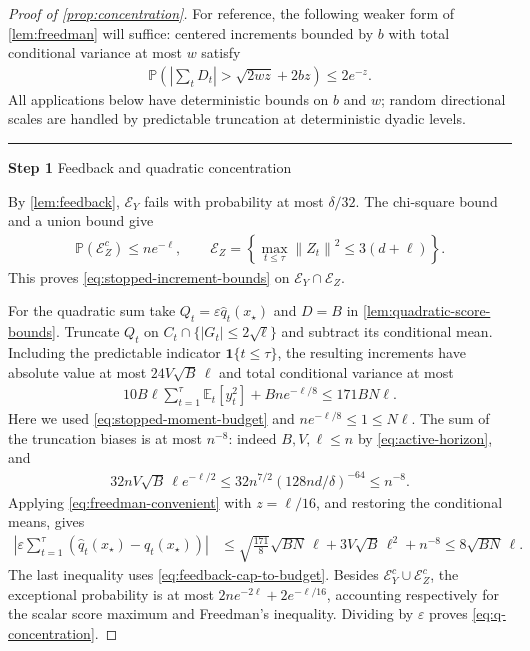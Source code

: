 \documentclass[11pt]{article}
\newcommand{\proofstep}[2]{%
    \par\medskip
    \noindent
    \textcolor{blue!55!black}{\rule{2pt}{1.2em}}%
    \hspace{0.6em}%
    {\sffamily\bfseries\color{blue!55!black}Step #1}%
    \quad
    {\sffamily #2}%
    \par\smallskip
}
\newcommand{\E}{\mathbb E}
\newcommand{\Pp}{\mathbb P}
\newcommand{\1}{\mathbf 1}
\newcommand{\eps}{\varepsilon}
\newcommand{\norm}[1]{\left\lVert #1\right\rVert}
\begin{document}
\begin{proof}[Proof of \cref{prop:concentration}]
    For reference, the following weaker form of \cref{lem:freedman}
    will suffice: centered increments bounded by $b$ with total
    conditional variance at most $w$ satisfy
    \begin{align}
        \Pp\left(\left|\sum_tD_t\right|>\sqrt{2wz}+2bz\right)
        \leq2e^{-z}.
        \label{eq:freedman-convenient}
    \end{align}
    All applications below have deterministic bounds on $b$ and $w$;
    random directional scales are handled by predictable truncation at
    deterministic dyadic levels.

    \proofstep{1}{Feedback and quadratic concentration}
    By \cref{lem:feedback}, $\mathcal E_Y$ fails with probability at most
    $\delta/32$. The chi-square bound and a union bound give
    \begin{align}
        \Pp(\mathcal E_Z^c)\leq ne^{-\ell},
        \qquad
        \mathcal E_Z=\left\{
        \max_{t\leq\tau}\norm{Z_t}^2\leq3(d+\ell)\right\}.
        \label{eq:Z-norm-union}
    \end{align}
    This proves \eqref{eq:stopped-increment-bounds} on
    $\mathcal E_Y\cap\mathcal E_Z$.

    For the quadratic sum take $Q_t=\eps\widehat q_t(x_\star)$ and
    $D=B$ in \cref{lem:quadratic-score-bounds}. Truncate $Q_t$ on
    $C_t\cap\{|G_t|\leq2\sqrt\ell\}$ and subtract its conditional mean.
    Including the predictable indicator $\1\{t\leq\tau\}$, the resulting
    increments have absolute value at most $24V\sqrt B\,\ell$ and total
    conditional variance at most
    \begin{align}
        10B\ell\sum_{t=1}^\tau\E_t[y_t^2]+Bn e^{-\ell/8}
        \leq171BN\ell.
        \label{eq:global-q-variance}
    \end{align}
    Here we used \eqref{eq:stopped-moment-budget} and
    $ne^{-\ell/8}\leq1\leq N\ell$.
    The sum of the truncation biases is at most $n^{-8}$: indeed
    $B,V,\ell\leq n$ by \eqref{eq:active-horizon}, and
    \begin{align}
        32nV\sqrt B\,\ell e^{-\ell/2}
        \leq32n^{7/2}(128nd/\delta)^{-64}\leq n^{-8}.
        \label{eq:scalar-total-bias}
    \end{align}
    Applying \eqref{eq:freedman-convenient} with $z=\ell/16$, and
    restoring the conditional means, gives
    \begin{align}
        \left|\eps\sum_{t=1}^\tau
        (\widehat q_t(x_\star)-q_t(x_\star))\right|
         & \leq\sqrt{\frac{171}{8}}\sqrt{BN}\,\ell
        +3V\sqrt B\,\ell^2+n^{-8}
        \leq8\sqrt{BN}\,\ell.
    \end{align}
    The last inequality uses \eqref{eq:feedback-cap-to-budget}.
    Besides $\mathcal E_Y^c\cup\mathcal E_Z^c$, the exceptional probability
    is at most $2ne^{-2\ell}+2e^{-\ell/16}$, accounting respectively for
    the scalar score maximum and Freedman's inequality.
    Dividing by $\eps$ proves \eqref{eq:q-concentration}.


\end{proof}
\end{document}
